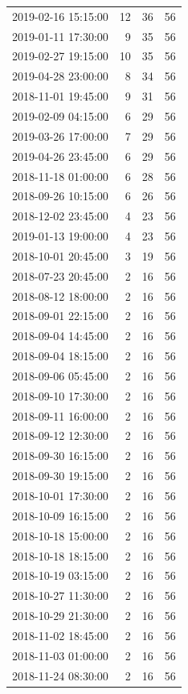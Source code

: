 \begin{tabular}{lrrr}
2019-02-16 15:15:00 & 12 & 36 & 56 \\
2019-01-11 17:30:00 & 9 & 35 & 56 \\
2019-02-27 19:15:00 & 10 & 35 & 56 \\
2019-04-28 23:00:00 & 8 & 34 & 56 \\
2018-11-01 19:45:00 & 9 & 31 & 56 \\
2019-02-09 04:15:00 & 6 & 29 & 56 \\
2019-03-26 17:00:00 & 7 & 29 & 56 \\
2019-04-26 23:45:00 & 6 & 29 & 56 \\
2018-11-18 01:00:00 & 6 & 28 & 56 \\
2018-09-26 10:15:00 & 6 & 26 & 56 \\
2018-12-02 23:45:00 & 4 & 23 & 56 \\
2019-01-13 19:00:00 & 4 & 23 & 56 \\
2018-10-01 20:45:00 & 3 & 19 & 56 \\
2018-07-23 20:45:00 & 2 & 16 & 56 \\
2018-08-12 18:00:00 & 2 & 16 & 56 \\
2018-09-01 22:15:00 & 2 & 16 & 56 \\
2018-09-04 14:45:00 & 2 & 16 & 56 \\
2018-09-04 18:15:00 & 2 & 16 & 56 \\
2018-09-06 05:45:00 & 2 & 16 & 56 \\
2018-09-10 17:30:00 & 2 & 16 & 56 \\
2018-09-11 16:00:00 & 2 & 16 & 56 \\
2018-09-12 12:30:00 & 2 & 16 & 56 \\
2018-09-30 16:15:00 & 2 & 16 & 56 \\
2018-09-30 19:15:00 & 2 & 16 & 56 \\
2018-10-01 17:30:00 & 2 & 16 & 56 \\
2018-10-09 16:15:00 & 2 & 16 & 56 \\
2018-10-18 15:00:00 & 2 & 16 & 56 \\
2018-10-18 18:15:00 & 2 & 16 & 56 \\
2018-10-19 03:15:00 & 2 & 16 & 56 \\
2018-10-27 11:30:00 & 2 & 16 & 56 \\
2018-10-29 21:30:00 & 2 & 16 & 56 \\
2018-11-02 18:45:00 & 2 & 16 & 56 \\
2018-11-03 01:00:00 & 2 & 16 & 56 \\
2018-11-24 08:30:00 & 2 & 16 & 56 \\

\end{tabular}
